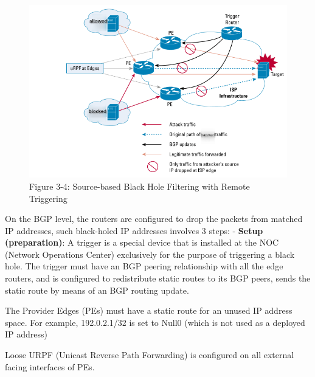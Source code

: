 \documentclass[sigconf]{acmart}
\begin{document}
\begin{figure}
\centering
\includegraphics{res/3-4-cisco-source.png}
\caption{Figure 3-4: Source-based Black Hole Filtering with Remote
Triggering}
\end{figure}

On the BGP level, the routers are configured to drop the packets from
matched IP addresses, such black-holed IP addresses involves 3 steps:
\cite{13_blackhole_cisco} \cite{14_blackhole_rfc} - \textbf{Setup
(preparation)}: A trigger is a special device that is installed at the
NOC (Network Operations Center) exclusively for the purpose of
triggering a black hole. The trigger must have an BGP peering
relationship with all the edge routers, and is configured to
redistribute static routes to its BGP peers, sends the static route by
means of an BGP routing update.

The Provider Edges (PEs) must have a static route for an unused IP
address space. For example, 192.0.2.1/32 is set to Null0 (which is not
used as a deployed IP address)

Loose URPF (Unicast Reverse Path Forwarding) is configured on all
external facing interfaces of PEs.
\end{document}
